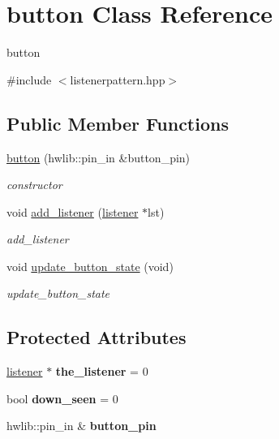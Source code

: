 \hypertarget{classbutton}{}\section{button Class Reference}
\label{classbutton}


button  




{\ttfamily \#include $<$listenerpattern.\+hpp$>$}

\subsection*{Public Member Functions}
\begin{DoxyCompactItemize}
\item 
\hyperlink{classbutton_aae05cb652f48e39acfe810e97ba4b2ea}{button} (hwlib\+::pin\+\_\+in \&button\+\_\+pin)
\begin{DoxyCompactList}\small\item\em constructor \end{DoxyCompactList}\item 
void \hyperlink{classbutton_acd710d9021a2132c250c25938b992b11}{add\+\_\+listener} (\hyperlink{classlistener}{listener} $\ast$lst)
\begin{DoxyCompactList}\small\item\em add\+\_\+listener \end{DoxyCompactList}\item 
void \hyperlink{classbutton_a545f0e24d8317692621c2f503ceb2fea}{update\+\_\+button\+\_\+state} (void)
\begin{DoxyCompactList}\small\item\em update\+\_\+button\+\_\+state \end{DoxyCompactList}\end{DoxyCompactItemize}
\subsection*{Protected Attributes}
\begin{DoxyCompactItemize}
\item 
\hypertarget{classbutton_a0c1b69d4c7bc60f8d0fbcc061dfc2b73}{}\label{classbutton_a0c1b69d4c7bc60f8d0fbcc061dfc2b73} 
\hyperlink{classlistener}{listener} $\ast$ {\bfseries the\+\_\+listener} = 0
\item 
\hypertarget{classbutton_adc9e520af7929f0a17198965ebc97559}{}\label{classbutton_adc9e520af7929f0a17198965ebc97559} 
bool {\bfseries down\+\_\+seen} = 0
\item 
\hypertarget{classbutton_a86a63f18b973c6061b03937fca410069}{}\label{classbutton_a86a63f18b973c6061b03937fca410069} 
hwlib\+::pin\+\_\+in \& {\bfseries button\+\_\+pin}
\end{DoxyCompactItemize}


